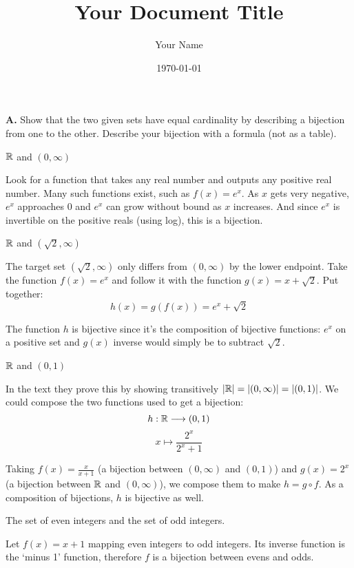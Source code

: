 \documentclass{article}
\title{Your Document Title}
\author{Your Name}
\date{\today} %
\begin{document}
\maketitle

\textbf{A.} Show that the two given sets have equal cardinality by describing a bijection from one to the other. Describe your bijection with a formula (not as a table).

\begin{problem}
$\mathbb{R}$ and $(0, \infty)$
\end{problem}

Look for a function that takes any real number and outputs any positive real number. Many such functions exist, such as $f(x) = e^x$. As $x$ gets very negative, $e^x$ approaches 0 and $e^x$ can grow without bound as $x$ increases. And since $e^x$ is invertible on the positive reals (using log), this is a bijection.

\begin{problem}
$\mathbb{R}$ and $(\sqrt{2}, \infty)$
\end{problem}

The target set $(\sqrt{2}, \infty)$ only differs from $(0, \infty)$ by the lower endpoint. Take the function $f(x) = e^x$ and follow it with the function $g(x) = x + \sqrt{2}$. Put together:
$$h(x) = g(f(x)) = e^x + \sqrt{2}$$

The function $h$ is bijective since it's the composition of bijective functions: $e^x$ on a positive set and $g(x)$ inverse would simply be to subtract $\sqrt{2}$.

\begin{problem}
$\mathbb{R}$ and $(0, 1)$
\end{problem}

In the text they prove this by showing transitively $|\mathbb{R}| = |(0, \infty)| = |(0, 1)|$. We could compose the two functions used to get a bijection:
$$h: \mathbb{R} \longrightarrow (0, 1)$$
$$x \longmapsto \frac{2^x}{2^x + 1}$$

Taking $f(x) = \frac{x}{x + 1}$ (a bijection between $(0, \infty)$ and $(0, 1)$) and $g(x) = 2^x$ (a bijection between $\mathbb{R}$ and $(0, \infty)$), we compose them to make $h = g \circ f$. As a composition of bijections, $h$ is bijective as well.

\begin{problem}
The set of even integers and the set of odd integers.
\end{problem}

Let $f(x) = x + 1$ mapping even integers to odd integers. Its inverse function is the `minus 1' function, therefore $f$ is a bijection between evens and odds.
\end{document}

